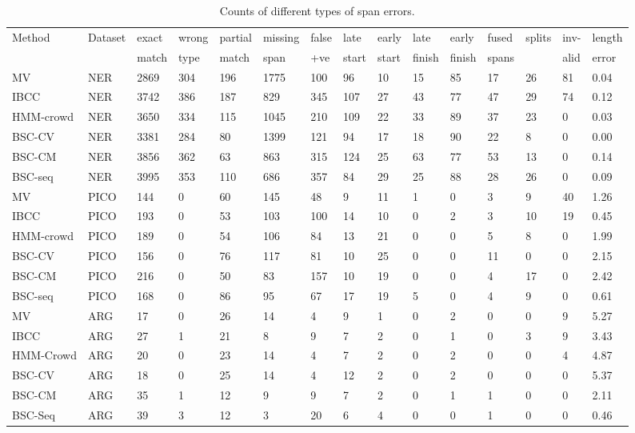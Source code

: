 \begin{table}[h]
\small
\centering
\setlength{\tabcolsep}{4pt}
\begin{tabular}{l l l l l l l l l l l l l l l }
\toprule
Method & Dataset & exact & wrong & partial  & missing  & false & late & early & late & early & fused & splits & inv- &  length \\ 
 & & match & type & match & span & +ve & start & start & finish & finish & spans &  & alid & error \\
\midrule
MV & NER & 2869 & 304 & 196 & 1775 & 100 & 96 & 10 & 15 & 85 & 17 & 26 & 81 & 0.04 \\
IBCC & NER & 3742 & 386 & 187 & 829 & 345 & 107 & 27 & 43 & 77 & 47 & 29 & 74 & 0.12 \\
HMM-crowd & NER & 3650 & 334 & 115 & 1045 & 210 & 109 & 22 & 33 & 89 & 37 & 23 & 0 & 0.03 \\
BSC-CV & NER & 3381 & 284 & 80 & 1399 & 121 & 94 & 17 & 18 & 90 & 22 & 8 & 0 & 0.00 \\
BSC-CM & NER & 3856 & 362 & 63 & 863 & 315 & 124 & 25 & 63 & 77 & 53 & 13 & 0 & 0.14 \\
BSC-seq & NER & 3995 & 353 & 110 & 686 & 357 &  84 &  29 &  25 &  88 &  28 &  26 & 0 & 0.09 \\
\midrule 
MV & PICO  & 144 & 0 & 60 & 145 & 48 & 9 & 11 & 1 & 0 & 3 & 9 & 40 & 1.26 \\
IBCC & PICO & 193 & 0 & 53 & 103 & 100 & 14 & 10 & 0 & 2 & 3 & 10 & 19 & 0.45 \\
HMM-crowd& PICO & 189 & 0 & 54 & 106 & 84 & 13 & 21 & 0 & 0 & 5 & 8 & 0 & 1.99 \\
BSC-CV     & PICO & 156 & 0 & 76 & 117 & 81 & 10 & 25 & 0 & 0 & 11 & 0 & 0 & 2.15 \\
BSC-CM     & PICO & 216 & 0 & 50 & 83 & 157 & 10 & 19 & 0 & 0 & 4 & 17 & 0 & 2.42\\
BSC-seq    & PICO & 168 & 0 & 86 & 95 & 67 & 17 & 19 & 5 & 0 & 4 & 9 & 0 & 0.61 \\
\midrule 
MV & ARG & 17 &  0 & 26 & 14 &  4  &  9 & 1 &  0 & 2 &  0 &  0 & 9 & 5.27 \\
IBCC & ARG & 27 & 1 & 21 & 8 & 9 & 7 & 2 & 0 & 1 & 0 & 3 & 9 & 3.43 \\
HMM-Crowd & ARG & 20 & 0 & 23 & 14 & 4 & 7 & 2 & 0 & 2 & 0 & 0 & 4 & 4.87 \\
BSC-CV & ARG & 18 & 0 & 25 & 14 & 4 & 12 & 2 & 0 & 2 & 0 & 0 & 0 & 5.37 \\
BSC-CM & ARG & 35 & 1 & 12 & 9 & 9 & 7 & 2 & 0 & 1 & 1 & 0 & 0 & 2.11 \\
BSC-Seq & ARG & 39 & 3 & 12 & 3 & 20 & 6 & 4 & 0 & 0 & 1 & 0 & 0 & 0.46 \\
\bottomrule
\end{tabular}
\caption{Counts of different types of span errors.}
\label{tab:error_analysis}
\end{table}
